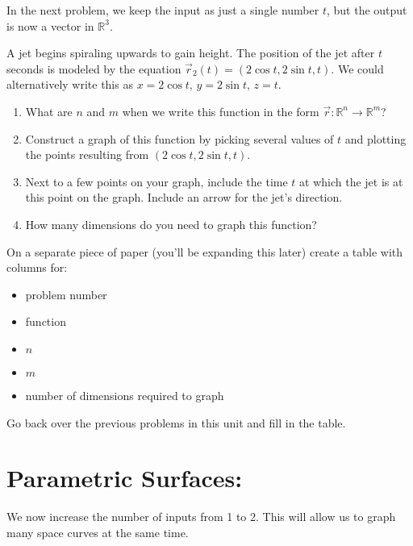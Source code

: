 In the next problem, we keep the input as just a single number $t$, but the output is now a vector in $\mathbb{R}^3$.

\begin{problem}\label{prob:jet intro for space curves}%
\label{space curve example}%
%
 A jet begins spiraling upwards to gain height. The position of the jet after $t$ seconds is modeled by the equation 
$\vec r_2(t)=(2\cos t, 2\sin t, t).$ We could alternatively write this as $x=2\cos t,\, y=2\sin t,\, z=t$. 
\begin{enumerate}
 \item What are $n$ and $m$ when we write this function in the form  $\vec r\colon {\mathbb{R}}^n\to {\mathbb{R}}^m$? 
 \item Construct a graph of this function by picking several values of $t$ and plotting the points resulting from $(2\cos t, 2\sin t, t)$. 
 \item Next to a few points on your graph, include the time $t$ at which the jet is at this point on the graph. Include an arrow for the jet's direction.
 \item  How many dimensions do you need to graph this function?
\end{enumerate}
\end{problem}

\begin{problem}\label{prob:function table}
On a separate piece of paper (you'll be expanding this later) create a table with columns for:
\begin{itemize}
	\item problem number
	\item function
	\item $n$
	\item $m$
	\item number of dimensions required to graph
\end{itemize}
Go back over the previous problems in this unit and fill in the table.
\end{problem}

\section{Parametric Surfaces:} %
We now increase the number of inputs from 1 to 2.  This will allow us to graph many space curves at the same time.


